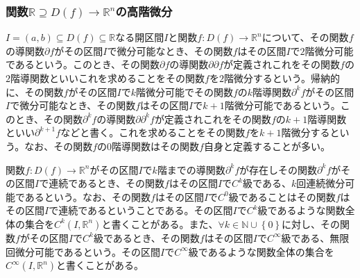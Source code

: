 \documentclass[dvipdfmx]{jsarticle}
\begin{document}
\subsubsection{関数$\mathbb{R}\supseteq D(f)\rightarrow \mathbb{R}^{n} $の高階微分}%
\begin{dfn}
$I = (a,b) \subseteq D(f) \subseteq \mathbb{R}$なる開区間$I$と関数$f:D(f) \rightarrow \mathbb{R}^{n}$について、その関数$f$の導関数$\partial f$がその区間$I$で微分可能なとき、その関数$f$はその区間$I$で$2$階微分可能であるという。このとき、その関数$\partial f$の導関数$\partial\partial f$が定義されこれをその関数$f$の$2$階導関数といいこれを求めることをその関数$f$を$2$階微分するという。帰納的に、その関数$f$がその区間$I$で$k$階微分可能でその関数$f$の$k$階導関数$\partial^{k}f$がその区間$I$で微分可能なとき、その関数$f$はその区間$I$で$k + 1$階微分可能であるという。このとき、その関数$\partial^{k}f$の導関数$\partial\partial^{k}f$が定義されこれをその関数$f$の$k + 1$階導関数といい$\partial^{k + 1}f$などと書く。これを求めることをその関数$f$を$k + 1$階微分するという。なお、その関数$f$の$0$階導関数はその関数$f$自身と定義することが多い。
\end{dfn}
\begin{dfn}
関数$f:D(f) \rightarrow \mathbb{R}^{n}$がその区間$I$で$k$階までの導関数$\partial^{k}f$が存在しその関数$\partial^{k}f$がその区間$I$で連続であるとき、その関数$f$はその区間$I$で$C^{k}$級である、$k$回連続微分可能であるという。なお、その関数$f$はその区間$I$で$C^{0}$級であることはその関数$f$はその区間$I$で連続であるということである。その区間$I$で$C^{k}$級であるような関数全体の集合を$C^{k}\left( I,\mathbb{R}^{n} \right)$と書くことがある。また、$\forall k \in \mathbb{N} \cup \left\{ 0 \right\}$に対し、その関数$f$がその区間$I$で$C^{k}$級であるとき、その関数$f$はその区間$I$で$C^{\infty}$級である、無限回微分可能であるという。その区間$I$で$C^{\infty}$級であるような関数全体の集合を$C^{\infty}\left( I,\mathbb{R}^{n} \right)$と書くことがある。
\end{dfn}
\end{document}
